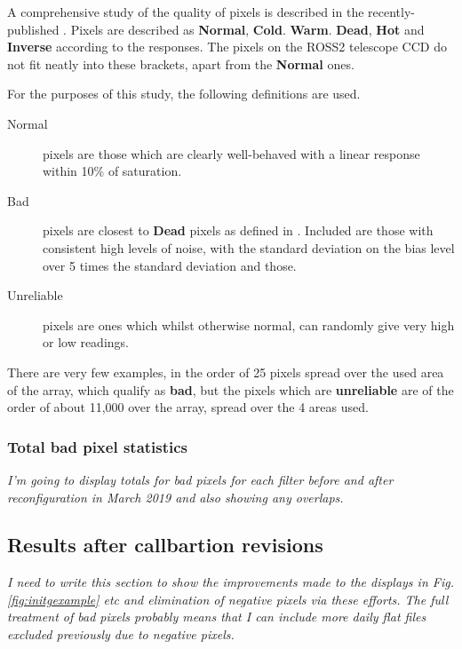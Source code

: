 A comprehensive study of the quality of pixels is described in the
recently-published \citet{maslennikova20}. Pixels are described as
\textbf{Normal}, \textbf{Cold}. \textbf{Warm}. \textbf{Dead}, \textbf{Hot} and
\textbf{Inverse} according to the responses. The pixels on the ROSS2 telescope
CCD do not fit neatly into these brackets, apart from the \textbf{Normal} ones.

For the purposes of this study, the following definitions are used.

\begin{description}
\item[Normal] pixels are those which are clearly well-behaved with a linear
response within 10\% of saturation.
\item[Bad] pixels are closest to \textbf{Dead} pixels as defined in 
\citet{maslennikova20}. Included are those with consistent high levels of noise,
with the standard deviation on the bias level over 5 times the standard
deviation and those.
\item[Unreliable] pixels are ones which whilst otherwise normal, can randomly
give very high or low readings.
\end{description}

There are very few examples, in the order of 25 pixels spread over the used area
of the array, which qualify as \textbf{bad}, but the pixels which are
\textbf{unreliable} are of the order of about 11,000 over the array, spread over
the 4 areas used.

\subsubsection{Total bad pixel statistics}
\protect\label{section:totalbadpix}

\textit{I'm going to display totals for bad pixels for each filter before and
after reconfiguration in March 2019 and also showing any overlaps.}

\subsection{Results after callbartion revisions}
\protect\label{section:postcalibration}

\textit{I need to write this section to show the improvements made to the
displays in Fig. \ref{fig:initgexample} etc and elimination of negative pixels
via these efforts. The full treatment of bad pixels probably means that I can
include more daily flat files excluded previously due to negative pixels.}

